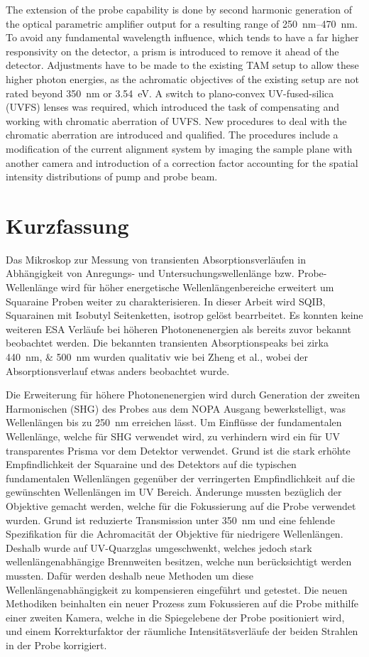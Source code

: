 \documentclass[twoside,openright,listof=numbered]{scrreprt}
\begin{document}
The extension of the probe capability is done by second harmonic generation of the optical parametric amplifier output for a resulting range of \SIrange{250}{470}{\nano\meter}. To avoid any fundamental wavelength influence, which tends to have a far higher responsivity on the detector, a prism is introduced to remove it ahead of the detector. Adjustments have to be made to the existing TAM setup to allow these higher photon energies, as the achromatic objectives of the existing setup are not rated beyond \qty{350}{\nano\meter} or \qty{3.54}{\electronvolt}. A switch to plano-convex UV-fused-silica (UVFS) lenses was required, which introduced the task of compensating and working with chromatic aberration of UVFS. New procedures to deal with the chromatic aberration are introduced and qualified. The procedures include a modification of the current alignment system by imaging the sample plane with another camera and introduction of a correction factor accounting for the spatial intensity distributions of pump and probe beam.

\chapter*{Kurzfassung}
Das Mikroskop zur Messung von transienten Absorptionsverläufen in Abhängigkeit von Anregungs- und Untersuchungswellenlänge bzw. Probe-Wellenlänge wird für höher energetische Wellenlängenbereiche erweitert um Squaraine Proben weiter zu charakterisieren. In dieser Arbeit wird SQIB, Squarainen mit Isobutyl Seitenketten, isotrop gelöst bearrbeitet. Es konnten keine weiteren ESA Verläufe bei höheren Photonenenergien als bereits zuvor bekannt beobachtet werden. Die bekannten transienten Absorptionspeaks bei zirka \SIlist{440;500}{\nano\meter} wurden qualitativ wie bei Zheng et al.\cite{Zheng2020}, wobei der Absorptionsverlauf etwas anders beobachtet wurde.

Die Erweiterung für höhere Photonenenergien wird durch Generation der zweiten Harmonischen (SHG) des Probes aus dem NOPA Ausgang bewerkstelligt, was Wellenlängen bis zu \qty{250}{\nano\meter} erreichen lässt. Um Einflüsse der fundamentalen Wellenlänge, welche für SHG verwendet wird, zu verhindern wird ein für UV transparentes Prisma vor dem Detektor verwendet. Grund ist die stark erhöhte Empfindlichkeit der Squaraine und des Detektors auf die typischen fundamentalen Wellenlängen gegenüber der verringerten Empfindlichkeit auf die gewünschten Wellenlängen im UV Bereich. Änderunge mussten bezüglich der Objektive gemacht werden, welche für die Fokussierung auf die Probe verwendet wurden. Grund ist reduzierte Transmission unter \qty{350}{\nano\meter} und eine fehlende Spezifikation für die Achromacität der Objektive für niedrigere Wellenlängen. Deshalb wurde auf UV-Quarzglas umgeschwenkt, welches jedoch stark wellenlängenabhängige Brennweiten besitzen, welche nun berücksichtigt werden mussten. Dafür werden deshalb neue Methoden um diese Wellenlängenabhängigkeit zu kompensieren eingeführt und getestet. Die neuen Methodiken beinhalten ein neuer Prozess zum Fokussieren auf die Probe mithilfe einer zweiten Kamera, welche in die Spiegelebene der Probe positioniert wird, und einem Korrekturfaktor der räumliche Intensitätsverläufe der beiden Strahlen in der Probe korrigiert.
\end{document}

